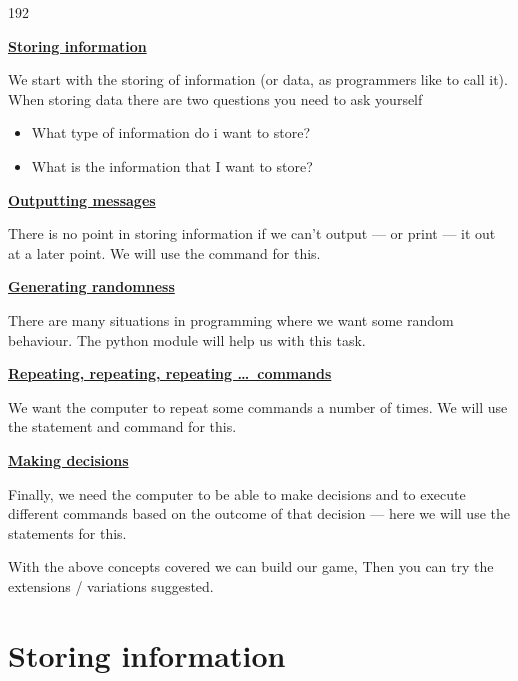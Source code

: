 \documentclass{coderdojo}
\begin{document}
\begin{dingautolist}{192}

\item \hyperref[sec:Store]{\color{section}\bfseries Storing information}

We start with the storing of information (or data, as programmers like to call it).  When storing data there are two questions you need to ask yourself
\begin{itemize}
\item What type of information do i want to store?
\item What is the information that I want to store?
\end{itemize}
\item \hyperref[sec:Output]{\color{section}\bfseries Outputting messages}

There is no point in storing information if we can't output --- or print --- it out at a later point. We will use the  command for this.

\item \hyperref[sec:Random]{\color{section}\bfseries Generating randomness}

There are many situations in programming where we want some random behaviour. The python module  will help us with this task.

\item \hyperref[sec:For]{\color{section}\bfseries Repeating, repeating, repeating \ldots\ commands}

We want the computer to repeat some commands a number of times. We will use the  statement and  command for this.

\item \hyperref[sec:If]{\color{section}\bfseries Making decisions}

Finally, we need the computer to be able to make decisions and to execute different commands based on the outcome of that decision --- here we will use the  statements for this. 
\end{dingautolist}

With the above concepts covered we can build our game,  Then you can try the extensions / variations suggested.
\clearpage




\section{Storing information}\label{sec:Store}
\end{document}
